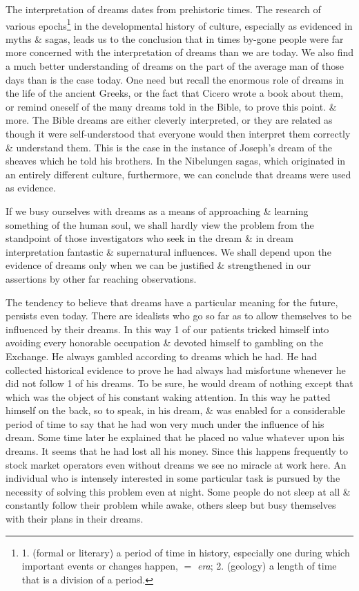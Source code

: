 \documentclass{article}
\begin{document}
The interpretation of dreams dates from prehistoric times. The research of various epochs\footnote{1. (formal or literary) a period of time in history, especially one during which important events or changes happen, $=$ {\it era}; 2. (geology) a length of time that is a division of a period.} in the developmental history of culture, especially as evidenced in myths \& sagas, leads us to the conclusion that in times by-gone people were far more concerned with the interpretation of dreams than we are today. We also find a much better understanding of dreams on the part of the average man of those days than is the case today. One need but recall the enormous role of dreams in the life of the ancient Greeks, or the fact that Cicero wrote a book about them, or remind oneself of the many dreams told in the Bible, to prove this point. \& more. The Bible dreams are either cleverly interpreted, or they are related as though it were self-understood that everyone would then interpret them correctly \& understand them. This is the case in the instance of Joseph's dream of the sheaves which he told his brothers. In the Nibelungen sagas, which originated in an entirely different culture, furthermore, we can conclude that dreams were used as evidence.

If we busy ourselves with dreams as a means of approaching \& learning something of the human soul, we shall hardly view the problem from the standpoint of those investigators who seek in the dream \& in dream interpretation fantastic \& supernatural influences. We shall depend upon the evidence of dreams only when we can be justified \& strengthened in our assertions by other far reaching observations.

The tendency to believe that dreams have a particular meaning for the future, persists even today. There are idealists who go so far as to allow themselves to be influenced by their dreams. In this way 1 of our patients tricked himself into avoiding every honorable occupation \& devoted himself to gambling on the Exchange. He always gambled according to dreams which he had. He had collected historical evidence to prove he had always had misfortune whenever he did not follow 1 of his dreams. To be sure, he would dream of nothing except that which was the object of his constant waking attention. In this way he patted himself on the back, so to speak, in his dream, \& was enabled for a considerable period of time to say that he had won very much under the influence of his dream. Some time later he explained that he placed no value whatever upon his dreams. It seems that he had lost all his money. Since this happens frequently to stock market operators even without dreams we see no miracle at work here. An individual who is intensely interested in some particular task is pursued by the necessity of solving this problem even at night. Some people do not sleep at all \& constantly follow their problem while awake, others sleep but busy themselves with their plans in their dreams.
\end{document}
